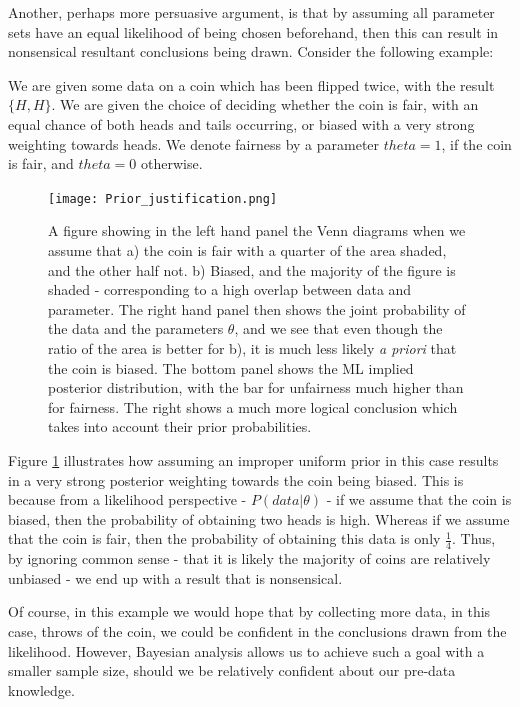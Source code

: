 \documentclass[11pt,fullpage]{book}
\begin{document}
Another, perhaps more persuasive argument, is that by assuming all parameter sets have an equal likelihood of being chosen beforehand, then this can result in nonsensical resultant conclusions being drawn. Consider the following example: 

We are given some data on a coin which has been flipped twice, with the result $\{H,H\}$. We are given the choice of deciding whether the  coin is fair, with an equal chance of both heads and tails occurring, or biased with a very strong weighting towards heads. We denote fairness by a parameter $theta=1$, if the coin is fair, and $theta=0$ otherwise.

\begin{figure}
\centering
\scalebox{0.75} 
{\texttt{[image: Prior\_justification.png]}}
\caption{A figure showing in the left hand panel the Venn diagrams when we assume that a) the coin is fair with a quarter of the area shaded, and the other half not. b) Biased, and the majority of the figure is shaded - corresponding to a high overlap between data and parameter. The right hand panel then shows the joint probability of the data and the parameters $\theta$, and we see that even though the ratio of the area is better for b), it is much less likely \textit{a priori} that the coin is biased. The bottom panel shows the ML implied posterior distribution, with the bar for unfairness much higher than for fairness. The right shows a much more logical conclusion which takes into account their prior probabilities.}\label{fig:Prior_justification}
\end{figure}

Figure \ref{fig:Prior_justification} illustrates how assuming an improper uniform prior in this case results in a very strong posterior weighting towards the coin being biased. This is because from a likelihood perspective - $P(data|\theta)$ - if we assume that the coin is biased, then the probability of obtaining two heads is high. Whereas if we assume that the coin is fair, then the probability of obtaining this data is only $\frac{1}{4}$. Thus, by ignoring common sense - that it is likely the majority of coins are relatively unbiased - we end up with a result that is nonsensical. 

Of course, in this example we would hope that by collecting more data, in this case, throws of the coin, we could be confident in the conclusions drawn from the likelihood. However, Bayesian analysis allows us to achieve such a goal with a smaller sample size, should we be relatively confident about our pre-data knowledge.
\end{document}
